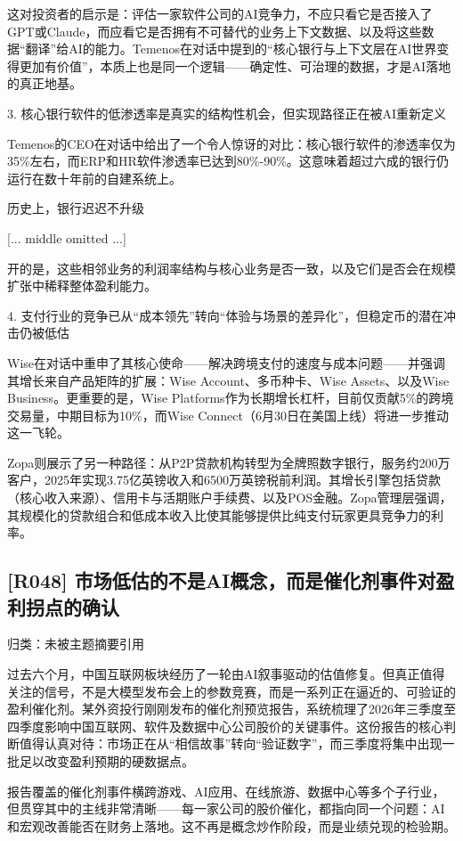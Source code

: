 \documentclass[11pt]{ctexart}
\begin{document}
这对投资者的启示是：评估一家软件公司的AI竞争力，不应只看它是否接入了GPT或Claude，而应看它是否拥有不可替代的业务上下文数据、以及将这些数据“翻译”给AI的能力。Temenos在对话中提到的“核心银行与上下文层在AI世界变得更加有价值”，本质上也是同一个逻辑——确定性、可治理的数据，才是AI落地的真正地基。

3. 核心银行软件的低渗透率是真实的结构性机会，但实现路径正在被AI重新定义

Temenos的CEO在对话中给出了一个令人惊讶的对比：核心银行软件的渗透率仅为35\%左右，而ERP和HR软件渗透率已达到80\%-90\%。这意味着超过六成的银行仍运行在数十年前的自建系统上。

历史上，银行迟迟不升级

[... middle omitted ...]

开的是，这些相邻业务的利润率结构与核心业务是否一致，以及它们是否会在规模扩张中稀释整体盈利能力。

4. 支付行业的竞争已从“成本领先”转向“体验与场景的差异化”，但稳定币的潜在冲击仍被低估

Wise在对话中重申了其核心使命——解决跨境支付的速度与成本问题——并强调其增长来自产品矩阵的扩展：Wise Account、多币种卡、Wise Assets、以及Wise Business。更重要的是，Wise Platforms作为长期增长杠杆，目前仅贡献5\%的跨境交易量，中期目标为10\%，而Wise Connect（6月30日在美国上线）将进一步推动这一飞轮。

Zopa则展示了另一种路径：从P2P贷款机构转型为全牌照数字银行，服务约200万客户，2025年实现3.75亿英镑收入和6500万英镑税前利润。其增长引擎包括贷款（核心收入来源）、信用卡与活期账户手续费、以及POS金融。Zopa管理层强调，其规模化的贷款组合和低成本收入比使其能够提供比纯支付玩家更具竞争力的利率。

\subsection{[R048] 市场低估的不是AI概念，而是催化剂事件对盈利拐点的确认}
{\small\color{refgray}归类：未被主题摘要引用}

过去六个月，中国互联网板块经历了一轮由AI叙事驱动的估值修复。但真正值得关注的信号，不是大模型发布会上的参数竞赛，而是一系列正在逼近的、可验证的盈利催化剂。某外资投行刚刚发布的催化剂预览报告，系统梳理了2026年三季度至四季度影响中国互联网、软件及数据中心公司股价的关键事件。这份报告的核心判断值得认真对待：市场正在从“相信故事”转向“验证数字”，而三季度将集中出现一批足以改变盈利预期的硬数据点。

报告覆盖的催化剂事件横跨游戏、AI应用、在线旅游、数据中心等多个子行业，但贯穿其中的主线非常清晰——每一家公司的股价催化，都指向同一个问题：AI和宏观改善能否在财务上落地。这不再是概念炒作阶段，而是业绩兑现的检验期。
\end{document}
